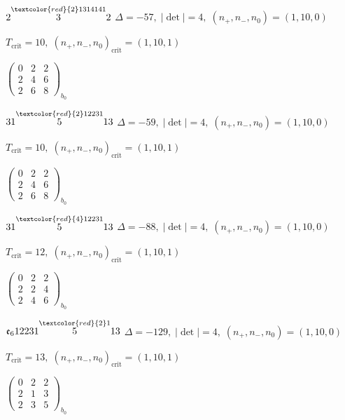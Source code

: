 \documentclass[10pt]{article}
\begin{document}
$2\overset{\textcolor{red}{2}1314141}{3}2$ \quad $\Delta=-57,\; |\det|=4,\; (n_+,n_-,n_0)=(1,10,0)$

\hspace{1em}$T_{\text{crit}}=10,\; (n_+,n_-,n_0)_{\text{crit}}=(1,10,1)$

\hspace{2em}$\left(\begin{smallmatrix}0 & 2 & 2 \\ 2 & 4 & 6 \\ 2 & 6 & 8\end{smallmatrix}\right)_{\!b_0}$

\smallskip

$31\overset{\textcolor{red}{2}12231}{5}13$ \quad $\Delta=-59,\; |\det|=4,\; (n_+,n_-,n_0)=(1,10,0)$

\hspace{1em}$T_{\text{crit}}=10,\; (n_+,n_-,n_0)_{\text{crit}}=(1,10,1)$

\hspace{2em}$\left(\begin{smallmatrix}0 & 2 & 2 \\ 2 & 4 & 6 \\ 2 & 6 & 8\end{smallmatrix}\right)_{\!b_0}$

$31\overset{\textcolor{red}{4}12231}{5}13$ \quad $\Delta=-88,\; |\det|=4,\; (n_+,n_-,n_0)=(1,10,0)$

\hspace{1em}$T_{\text{crit}}=12,\; (n_+,n_-,n_0)_{\text{crit}}=(1,10,1)$

\hspace{2em}$\left(\begin{smallmatrix}0 & 2 & 2 \\ 2 & 2 & 4 \\ 2 & 4 & 6\end{smallmatrix}\right)_{\!b_0}$

\smallskip

$\mathfrak{e}_612231\overset{\textcolor{red}{2}1}{5}13$ \quad $\Delta=-129,\; |\det|=4,\; (n_+,n_-,n_0)=(1,10,0)$

\hspace{1em}$T_{\text{crit}}=13,\; (n_+,n_-,n_0)_{\text{crit}}=(1,10,1)$

\hspace{2em}$\left(\begin{smallmatrix}0 & 2 & 2 \\ 2 & 1 & 3 \\ 2 & 3 & 5\end{smallmatrix}\right)_{\!b_0}$
\end{document}
